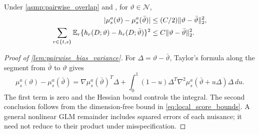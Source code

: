 \documentclass[12pt]{article}
\begin{document}
\begin{lemma}\label{lem:pairwise_bias_variance}
Under \cref{asmp:pairwise_overlap} and , for $\vartheta\in\mathcal N$,
\[
\begin{aligned}
|\mu_s^a(\vartheta)-\mu_s^a(\bar\vartheta)|&\le(C/2)\|\vartheta-\bar\vartheta\|_2^2,
\\
\sum_{r\in\{t,s\}}\mathbb{E}_r\{h_r(D;\vartheta)-h_r(D;\bar\vartheta)\}^2
&\le C\|\vartheta-\bar\vartheta\|_2^2.
\end{aligned}
\]
\end{lemma}
\begin{proof}[Proof of \cref{lem:pairwise_bias_variance}]
For $\Delta=\vartheta-\bar\vartheta$, Taylor's formula along the segment from $\bar\vartheta$ to $\vartheta$ gives
\[
\mu_s^a(\vartheta)-\mu_s^a(\bar\vartheta)
=\nabla \mu_s^a(\bar\vartheta)^T\Delta
+\int_0^1(1-u)\Delta^T\nabla^2\mu_s^a(\bar\vartheta+u\Delta)\Delta\,du.
\]
The first term is zero and the Hessian bound controls the integral. The second conclusion follows from the dimension-free bound in \cref{eq:local_score_bounds}. A general nonlinear GLM remainder includes squared errors of each nuisance; it need not reduce to their product under misspecification.
\end{proof}

\end{document}
